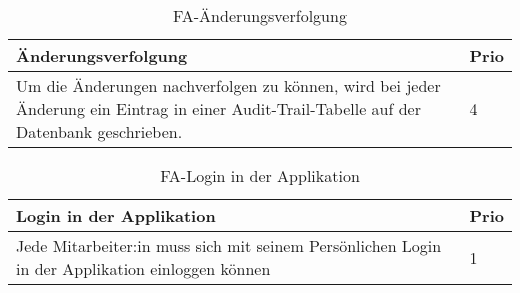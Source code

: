 \begin{table}[H]
  \centering
  \settowidth{}
  \setlength\extrarowheight{2pt}
  \begin{tabulary}{1.0\textwidth}{|m{16cm}|L|}
    \hline
    \textbf{Änderungsverfolgung}&\textbf{Prio}\\
    \hline
     Um die Änderungen nachverfolgen zu können, wird bei jeder Änderung ein Eintrag in einer Audit-Trail-Tabelle auf der Datenbank geschrieben. & 4\\
    \hline
  \end{tabulary}
  \caption{FA-Änderungsverfolgung}
  \label{faAenderungsverfolgung}
\end{table}

\begin{table}[H]
  \centering
  \settowidth{}
  \setlength\extrarowheight{2pt}
  \begin{tabulary}{1.0\textwidth}{|m{16cm}|L|}
    \hline
    \textbf{Login in der Applikation}&\textbf{Prio}\\
    \hline
    Jede Mitarbeiter:in muss sich mit seinem Persönlichen Login in der Applikation einloggen können & 1\\
    \hline
  \end{tabulary}
  \caption{FA-Login in der Applikation}
  \label{faLogininderApplikatio}
\end{table}
